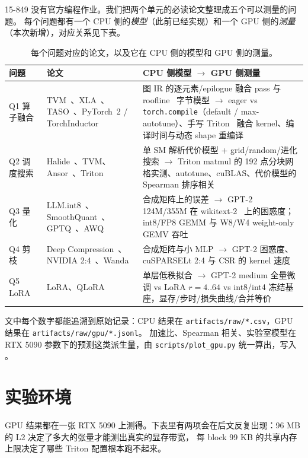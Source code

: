 \documentclass[11pt,a4paper]{ctexart}
\begin{document}
15-849 没有官方编程作业。我们把两个单元的必读论文整理成五个可以测量的问题。
每个问题都有一个 CPU 侧的\emph{模型}（此前已经实现）和一个 GPU 侧的\emph{测量}（本次新增），对应关系见下表。

\begin{table}[H]
\centering\small
\begin{tabularx}{\linewidth}{p{2.6cm}p{3.6cm}X}
\toprule
问题 & 论文 & CPU 侧模型 $\rightarrow$ GPU 侧测量 \\
\midrule
Q1 算子融合 & TVM~\cite{tvm}、XLA~\cite{xla}、TASO~\cite{taso}、PyTorch~2 / TorchInductor~\cite{pt2} & 图 IR 的逐元素/epilogue 融合 pass 与 roofline~\cite{roofline} 字节模型 $\rightarrow$ eager vs \texttt{torch.compile}（default / max-autotune）、手写 Triton~\cite{triton} 融合 kernel、编译时间与动态 shape 重编译 \\
Q2 调度搜索 & Halide~\cite{halide}、TVM、Ansor~\cite{ansor}、Triton & 单 SM 解析代价模型 + grid/random/进化搜索 $\rightarrow$ Triton matmul 的 192 点分块网格实测、autotune、cuBLAS、代价模型的 Spearman 排序相关 \\
Q3 量化 & LLM.int8~\cite{llmint8}、SmoothQuant~\cite{smoothquant}、GPTQ~\cite{gptq}、AWQ~\cite{awq} & 合成矩阵上的误差 $\rightarrow$ GPT-2~\cite{gpt2} 124M/355M 在 wikitext-2~\cite{wikitext} 上的困惑度；int8/FP8 GEMM 与 W8/W4 weight-only GEMV 吞吐 \\
Q4 剪枝 & Deep Compression~\cite{deepcomp}、NVIDIA 2:4~\cite{nm}、Wanda~\cite{wanda} & 合成矩阵与小 MLP $\rightarrow$ GPT-2 困惑度、cuSPARSELt 2:4 与 CSR 的 kernel 速度 \\
Q5 LoRA~\cite{lora} & LoRA、QLoRA~\cite{qlora} & 单层低秩拟合 $\rightarrow$ GPT-2 medium 全量微调 vs LoRA $r{=}4..64$ vs int8/int4 冻结基座，显存/步时/损失曲线/合并等价 \\
\bottomrule
\end{tabularx}
\caption{每个问题对应的论文，以及它在 CPU 侧的模型和 GPU 侧的测量。}
\end{table}

文中每个数字都能追溯到原始记录：CPU 结果在 \texttt{artifacts/raw/*.csv}，GPU 结果在 \texttt{artifacts/raw/gpu/*.jsonl}。
加速比、Spearman 相关、实验室模型在 RTX 5090 参数下的预测这类派生量，由 \texttt{scripts/plot\_gpu.py} 统一算出，写入 。

\section{实验环境}

GPU 结果都在一张 RTX 5090 上测得。下表里有两项会在后文反复出现：96 MB 的 L2 决定了多大的张量才能测出真实的显存带宽，
每 block 99 KB 的共享内存上限决定了哪些 Triton 配置根本跑不起来。
\end{document}
